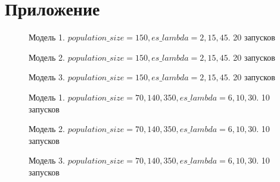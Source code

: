 \chapter*{Приложение}							%

\begin{figure}[h]
  \center{\texttt{[image: pm1]}}
  \caption{Модель 1. $population\_size = 150, es\_lambda = 2,15,45$. 20 запусков}
  \label{img:pm1}
\end{figure}

\begin{figure}[h]
  \center{\texttt{[image: pm1]}}
  \caption{Модель 2. $population\_size = 150, es\_lambda = 2,15,45$. 20 запусков}
  \label{img:pm2}
\end{figure}

\begin{figure}[h]
  \center{\texttt{[image: pm2]}}
  \caption{Модель 3. $population\_size = 150, es\_lambda = 2,15,45$. 20 запусков}
  \label{img:pm3}
\end{figure}

\begin{figure}[h]
  \center{\texttt{[image: em1]}}
  \caption{Модель 1. $population\_size = 70,140,350, es\_lambda = 6,10,30$. 10 запусков}
  \label{img:em1}
\end{figure}

\begin{figure}[h]
  \center{\texttt{[image: em1]}}
  \caption{Модель 2. $population\_size = 70,140,350, es\_lambda = 6,10,30$. 10 запусков}
  \label{img:em2}
\end{figure}

\begin{figure}[h]
  \center{\texttt{[image: em2]}}
  \caption{Модель 3. $population\_size = 70,140,350, es\_lambda = 6,10,30$. 10 запусков}
  \label{img:em3}
\end{figure}

\clearpage
